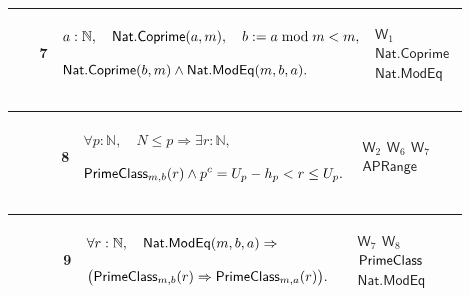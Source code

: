 \documentclass[12pt,reqno]{amsart}
\theoremstyle{blueplain}
\numberwithin{equation}{section}
\begin{document}
{\scriptsize \setlength{\parskip}{0pt}\nointerlineskip
\noindent 
\begin{tabular}{|@{}>{\centering\arraybackslash}m{0.10658\linewidth}|>{\centering\arraybackslash}m{0.03553\linewidth}|>{\centering\arraybackslash}m{0.52105\linewidth}|>{\centering\arraybackslash}m{0.23684\linewidth}|}
\hline
{\hypertarget{row:W7}{$\mathsf{W}$}} & {7} & {$\displaystyle a:\mathbb{N}%
,\quad \hyperlink{def:Nat.Coprime}{\mathsf{Nat.Coprime} }(a,m),\quad b:=a%
\bmod m<m,$ \par$\displaystyle \hyperlink{def:Nat.Coprime}{\mathsf{%
Nat.Coprime} }(b,m)\wedge \hyperlink{def:Nat.ModEq}{\mathsf{Nat.ModEq} }%
(m,b,a).$} & {\hyperlink{row:W1}{$\mathsf{W}_{1}$} \hyperlink{def:Nat.Coprime}%
{$\mathsf{Nat.Coprime}$} \hyperlink{def:Nat.ModEq}{$\mathsf{Nat.ModEq}$}} \\ 
\hline
\end{tabular}%
}

{\scriptsize \setlength{\parskip}{0pt}\nointerlineskip
\noindent 
\begin{tabular}{|@{}>{\centering\arraybackslash}m{0.10658\linewidth}|>{\centering\arraybackslash}m{0.03553\linewidth}|>{\centering\arraybackslash}m{0.52105\linewidth}|>{\centering\arraybackslash}m{0.23684\linewidth}|}
\hline
{\hypertarget{row:W8}{$\mathsf{W}$}} & {8} & {$\displaystyle \forall p:%
\mathbb{N},\quad N\le p\Rightarrow\exists r:\mathbb{N},$ \par$\displaystyle 
\hyperlink{def:PrimeClass}{\mathsf{PrimeClass} }_{m,b}(r)\wedge
p^c=U_p-h_p<r\le U_p.$} & {\hyperlink{row:W2}{$\mathsf{W}_{2}$} \hyperlink{row:W6}%
{$\mathsf{W}_{6}$} \hyperlink{row:W7}{$\mathsf{W}_{7}$} \hyperlink{def:APRange}%
{$\mathsf{APRange}$}} \\ \hline
\end{tabular}%
}

{\scriptsize \setlength{\parskip}{0pt}\nointerlineskip
\noindent 
\begin{tabular}{|@{}>{\centering\arraybackslash}m{0.10658\linewidth}|>{\centering\arraybackslash}m{0.03553\linewidth}|>{\centering\arraybackslash}m{0.52105\linewidth}|>{\centering\arraybackslash}m{0.23684\linewidth}|}
\hline
{\hypertarget{row:W9}{$\mathsf{W}$}} & {9} & {$\displaystyle \forall r:%
\mathbb{N},\quad \hyperlink{def:Nat.ModEq}{\mathsf{Nat.ModEq} }%
(m,b,a)\Rightarrow$ \par$\displaystyle \bigl(\hyperlink{def:PrimeClass}{%
\mathsf{PrimeClass} }_{m,b}(r)\Rightarrow \hyperlink{def:PrimeClass}{\mathsf{%
PrimeClass} }_{m,a}(r)\bigr).$} & {\hyperlink{row:W7}{$\mathsf{W}_{7}$} 
\hyperlink{row:W8}{$\mathsf{W}_{8}$} \hyperlink{def:PrimeClass}{$\mathsf{%
PrimeClass}$} \hyperlink{def:Nat.ModEq}{$\mathsf{Nat.ModEq}$}} \\ \hline
\end{tabular}%
}
\end{document}
